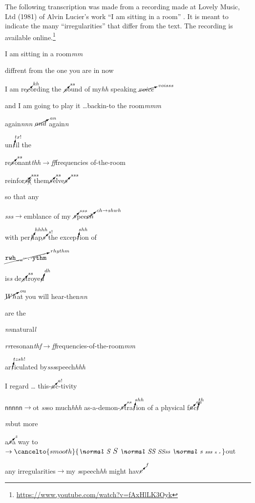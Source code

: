 The following transcription was made from a recording made at Lovely Music, Ltd (1981) of Alvin Lucier's work ``I am sitting in a room'' \parencite{Luc70:Iam}. It is meant to indicate the many ``irregularities'' that differ from the text. The recording is available online.\footnote{\url{https://www.youtube.com/watch?v=fAxHlLK3Oyk}} 

I am sitting in a room\textit{mm}\par
diffrent from the one you are in now\par
{}
I am re$\cancelto{kh}{c}$ording the $\cancelto{ss}{s}$ound of my\textit{hh} speaking $\cancelto{voisss}{voice}$ \par
{}
and I am going to play it \dots backin-to the room\textit{mmm} \par
again\textit{nnn} $\cancelto{an}{and}$  again\textit{n} \par
{}
un$\cancelto{tx!}{t}$il the\par
re$\cancelto{ss}{s}$onant\textit{thh$\rightarrow$ff}frequencies of-the-room\par
{}
reinfor$\cancelto{sss}{s}\xcancel{e}$ them$\cancelto{ss}{s}$elve$\cancelto{sss}{s}$\par
{}
so that any \par
\textit{{\small s}ss}$\rightarrow$emblance of my $\cancelto{sss}{s}$pee$\cancelto{ch\rightarrow shwh}{ch}$\par
{}
with per$\cancelto{hhhh}{h}$ap$\cancelto{s!}{s}$ the excep$\cancelto{shh}{t}$ion of\par
$\cancelto{rhythm}{\texttt{rwh\_\_$\cdot\cdot$.$\cdot$ythm}}$\par
is\textit{s} de$\cancelto{ss}{s}$troye$\cancelto{dh}{d}$\par
\par\par
$\cancelto{ou}{Wh}$at you will hear-then\textit{nn} \par
{}
are the\par
\quad \textit{nn}natural\textit{l}\par
\quad \quad \textit{rr}resonan\textit{thf$\rightarrow$ff}requencies-of-the-room\textit{mm}\par
ar$\cancelto{tzsh!}{t}$iculated by\textit{sss}speech\textit{hhh} \par
I regard \dots{} this-$\cancelto{a!}{a}$c-tivity\par
{}
\texttt{nnnnn$\rightarrow$}ot \textit{ss}so much\textit{hhh} as-a-demon-$\cancelto{ss}{s}$tra$\cancelto{shh}{t}$ion of a physical f$\cancelto{aa}{a}$c$\cancelto{th}{t}$\par
{}
\textit{m}but more\par
{}
a$\cancelto{z}{s}$a way {} to$\rightarrow\cancelto{smooth}{\textit{{\normal S }{\large S }{\normal SS }{\small SSss }{\normal s }{\footnotesize sss  }{\scriptsize s  }{\tiny s }}}$\normal out \par
any irregularities$\rightarrow$my \textit{s}speech\textit{hh} might hav$\cancelto{f}{e}$

